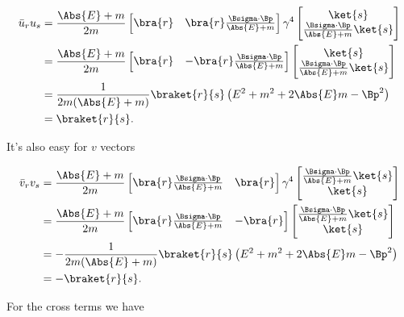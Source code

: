 \begin{align*}
\bar{u}_r u_s 
&= 
\frac{\Abs{E} + m}{2m}
\begin{bmatrix}
\bra{r} &
\bra{r} \frac{\Bsigma \cdot \Bp}{\Abs{E} + m} 
\end{bmatrix}
\gamma^4
\begin{bmatrix}
\ket{s} \\
\frac{\Bsigma \cdot \Bp}{\Abs{E} + m} \ket{s}
\end{bmatrix} \\
&=
\frac{\Abs{E} + m}{2m}
\begin{bmatrix}
\bra{r} &
-\bra{r} \frac{\Bsigma \cdot \Bp}{\Abs{E} + m} 
\end{bmatrix}
\begin{bmatrix}
\ket{s} \\
\frac{\Bsigma \cdot \Bp}{\Abs{E} + m} \ket{s}
\end{bmatrix} \\
&=
\frac{1}{2m(\Abs{E} + m)}
\braket{r}{s} \left( E^2 + m^2 + 2 \Abs{E} m - \Bp^2 \right) \\
&=
\braket{r}{s}.
\end{align*}

It's also easy for $v$ vectors

\begin{align*}
\bar{v}_r v_s 
&= 
\frac{\Abs{E} + m}{2m}
\begin{bmatrix}
\bra{r} \frac{\Bsigma \cdot \Bp}{\Abs{E} + m} &
\bra{r} 
\end{bmatrix}
\gamma^4
\begin{bmatrix}
\frac{\Bsigma \cdot \Bp}{\Abs{E} + m} \ket{s} \\
\ket{s} 
\end{bmatrix} \\
&=
\frac{\Abs{E} + m}{2m}
\begin{bmatrix}
\bra{r} \frac{\Bsigma \cdot \Bp}{\Abs{E} + m} &
-\bra{r} 
\end{bmatrix}
\begin{bmatrix}
\frac{\Bsigma \cdot \Bp}{\Abs{E} + m} \ket{s} \\
\ket{s} 
\end{bmatrix} \\
&=
-\frac{1}{2m(\Abs{E} + m)}
\braket{r}{s} \left( E^2 + m^2 + 2 \Abs{E} m - \Bp^2 \right) \\
&=
-\braket{r}{s}.
\end{align*}

For the cross terms we have

